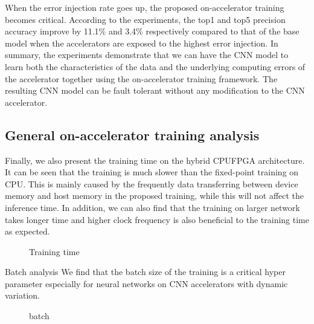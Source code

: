 When the error injection rate goes up, the proposed on-accelerator training becomes critical. 
According to the experiments, the top1 and top5 precision accuracy improve by 11.1\% and 3.4\%
respectively compared to that of the base model when the accelerators are exposed to the highest 
error injection. In summary, the experiments demonstrate that we can have the CNN model to learn 
both the characteristics of the data and the underlying computing errors of the accelerator 
together using the on-accelerator training framework. The resulting CNN model can be fault tolerant 
without any modification to the CNN accelerator.  

\subsection{General on-accelerator training analysis}
  Finally, we also present the training time on the hybrid CPUFPGA architecture. 
It can be seen that the training is much slower than the fixed-point training on CPU. 
This is mainly caused by the frequently data transferring between device memory and host 
memory in the proposed training, while this will not affect the inference time. In addition, 
we can also find that the training on larger network takes longer time and higher clock frequency 
is also beneficial to the training time as expected. 

\begin{figure}
        \caption{Training time}
        \label{fig:time}
\end{figure}

Batch analysis
  We find that the batch size of the training is a critical hyper parameter especially for
neural networks on CNN accelerators with dynamic variation. 

\begin{figure}
        \caption{batch}
        \label{fig:batch}
\end{figure}
